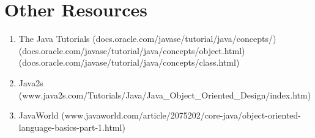 \documentclass[a4paper]{article}
\begin{document}
\newpage

\section*{Other Resources}
\begin{enumerate}
\item The Java Tutorials (docs.oracle.com/javase/tutorial/java/concepts/) (docs.oracle.com/javase/tutorial/java/concepts/object.html) 
(docs.oracle.com/javase/tutorial/java/concepts/class.html) 
\item Java2s (www.java2s.com/Tutorials/Java/Java\_Object\_Oriented\_Design/index.htm) 
\item JavaWorld (www.javaworld.com/article/2075202/core-java/object-oriented-language-basics-part-1.html) 
\end{enumerate}
\end{document}
